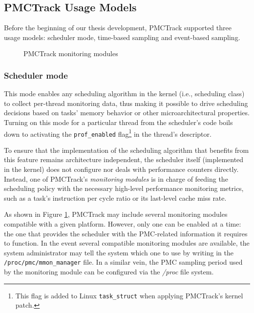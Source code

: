 \subsection{PMCTrack Usage Models}\label{pmctrack-usage-models}

Before the beginning of our thesis development, PMCTrack supported three
usage models: scheduler mode, time-based sampling and event-based
sampling.

\begin{figure}[tbp!]
\centering
{}

\caption{PMCTrack monitoring modules}
\label{fig:mmon}
\end{figure}

\subsubsection{Scheduler mode}\label{scheduler-mode}

This mode enables any scheduling algorithm in the kernel (i.e.,
scheduling class) to collect per-thread monitoring data, thus making it
possible to drive scheduling decisions based on tasks' memory behavior
or other microarchitectural properties. Turning on this mode for a
particular thread from the scheduler's code boils down to activating the
\texttt{prof\_enabled}
flag\footnote{This flag is added to Linux \texttt{task\_struct} when applying PMCTrack's kernel patch.}
in the thread's descriptor.

To ensure that the implementation of the scheduling algorithm that
benefits from this feature remains architecture independent, the
scheduler itself (implemented in the kernel) does not configure nor
deals with performance counters directly. Instead, one of PMCTrack's
\textit{monitoring modules} is in charge of feeding the scheduling
policy with the necessary high-level performance monitoring metrics,
such as a task's instruction per cycle ratio or its last-level cache
miss rate.

As shown in Figure \ref{fig:mmon}, PMCTrack may include several
monitoring modules compatible with a given platform. However, only one
can be enabled at a time: the one that provides the scheduler with the
PMC-related information it requires to function. In the event several
compatible monitoring modules are available, the system administrator
may tell the system which one to use by writing in the
\texttt{/proc/pmc/mmon\_manager} file. In a similar vein, the PMC
sampling period used by the monitoring module can be configured via the
\emph{/proc} file system.


